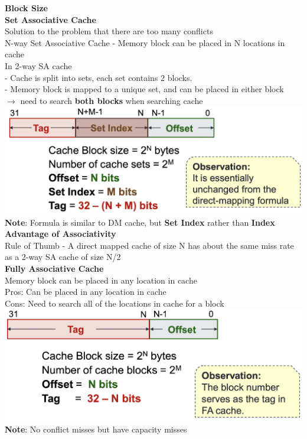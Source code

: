 \documentclass[10pt, a4paper]{article}
\newcommand{\highlight}[1]{{\color{red}\textbf{#1}}}
\newcommand{\blue}[1]{{\color{MidnightBlue}#1}}
\newcommand{\red}[1]{{\color{red}#1}}
\newcommand{\green}[1]{{\color{ForestGreen}#1}}
\begin{document}
\begin{multicols*}{3}
		\textbf{Block Size}\\


		\textbf{Set Associative Cache}\\
		Solution to the problem that there are too many conflicts\\
		\blue{N-way Set Associative Cache} - Memory block can be placed in N locations in cache\\

		In 2-way SA cache\\
		- Cache is split into sets, each set contains 2 blocks.\\
		- Memory block is mapped to a unique set, and can be placed in either block\\
		$\rightarrow$ need to search \highlight{both blocks} when searching cache\\
		\includegraphics[scale=.32]{./assets/SACache}
		\highlight{Note}: Formula is similar to DM cache, but \highlight{Set Index} rather than \highlight{Index}\\

		\textbf{Advantage of Associativity}\\
		Rule of Thumb - A direct mapped cache of size N has about the same miss rate as a 2-way SA cache of size N/2\\

		\textbf{Fully Associative Cache}\\
		Memory block can be placed in any location in cache\\
		\green{Pros}: Can be placed in any location in cache\\
		\red{Cons}: Need to search all of the locations in cache for a block\\
		\includegraphics[scale=.3]{./assets/FACache}\\
		\highlight{Note}: No conflict misses but have capacity misses\\


\end{multicols*}
\end{document}
